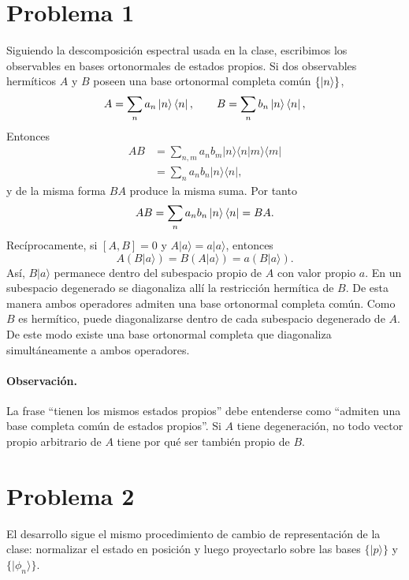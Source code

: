 \documentclass[11pt,a4paper]{article}
\numberwithin{equation}{section}
\begin{document}
\section{Problema 1}
Siguiendo la descomposición espectral usada en la clase, escribimos los observables en bases ortonormales de estados propios. Si dos observables hermíticos $A$ y $B$ poseen una base ortonormal completa común $\{\ket n\}$,
\begin{equation}
A=\sum_na_n\ket n\bra n,\qquad B=\sum_nb_n\ket n\bra n,
\end{equation}
Entonces
\begin{align}
AB&=\sum_{n,m}a_nb_m|n\rangle\langle n|m\rangle\langle m|\\
&=\sum_n a_nb_n|n\rangle\langle n|,
\end{align}
y de la misma forma $BA$ produce la misma suma. Por tanto
\begin{equation}
AB=\sum_na_nb_n\ket n\bra n=BA.
\end{equation}
Recíprocamente, si $[A,B]=0$ y $A|a\rangle=a|a\rangle$, entonces
\begin{equation}
A(B|a\rangle)=B(A|a\rangle)=a(B|a\rangle).
\end{equation}
Así, $B|a\rangle$ permanece dentro del subespacio propio de $A$ con valor propio $a$. En un subespacio degenerado se diagonaliza allí la restricción hermítica de $B$. De esta manera ambos operadores admiten una base ortonormal completa común. Como $B$ es hermítico, puede diagonalizarse dentro de cada subespacio degenerado de $A$. De este modo existe una base ortonormal completa que diagonaliza simultáneamente a ambos operadores.

\paragraph{Observación.}
La frase ``tienen los mismos estados propios'' debe entenderse como ``admiten una base completa común de estados propios''. Si $A$ tiene degeneración, no todo vector propio arbitrario de $A$ tiene por qué ser también propio de $B$.


\section{Problema 2}
El desarrollo sigue el mismo procedimiento de cambio de representación de la clase: normalizar el estado en posición y luego proyectarlo sobre las bases $\{|p\rangle\}$ y $\{|\phi_n\rangle\}$.
\end{document}
